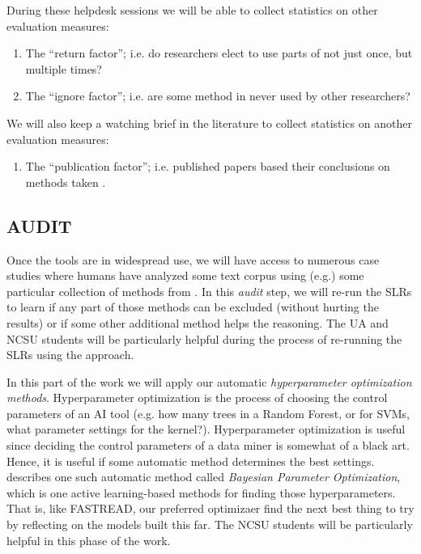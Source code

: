 During these helpdesk sessions we will be able
to collect statistics on  other evaluation measures:
\begin{enumerate}[resume,itemsep=0pt,parsep=0pt]
\item
The ``return factor''; i.e. do researchers  elect to use  parts
of {\IT} not just once, but multiple times?
\item
The ``ignore factor''; i.e. are some  method   in {\IT} never used by other researchers?
\end{enumerate}
We will also keep a watching brief in the literature to
collect statistics on another    evaluation measures:

\begin{enumerate}[resume,itemsep=0pt,parsep=0pt]
\item
The ``publication factor''; i.e. published papers based their conclusions on methods taken     {\IT}.
\end{enumerate}




\subsection{AUDIT}\label{tion:aud}
Once the tools are in widespread use, we will have access to numerous case
studies where humans have analyzed some text corpus using (e.g.) some
particular collection of methods  from . In this {\em audit} step, we will re-run the SLRs to learn if any part of those methods can be excluded
(without hurting the results) or if some other additional method helps the reasoning.
The UA and NCSU students will be particularly helpful during the process of re-running the SLRs using the approach.

In this part of the work we will apply our automatic
{\em hyperparameter optimization methods}.
Hyperparameter
optimization is the process
of choosing the control
parameters of an AI tool
(e.g. how many trees in a Random Forest, or for SVMs, what parameter settings for the kernel?). Hyperparameter optimization is useful since deciding the control parameters of a data miner is somewhat of a black art. Hence, it is useful if some automatic method determines the best settings.  describes  one such automatic method
called 
{\em Bayesian Parameter Optimization}, which is one
active learning-based methods for finding those hyperparameters.
That is, like FASTREAD, our preferred optimizaer
find the next best thing to try by
reflecting on  the models
built this far.
The NCSU students will be particularly helpful in this phase of the work.

